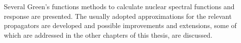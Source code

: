 \begin{WTabstract}%
Several Green's functions methods to calculate nuclear spectral 
functions and response are presented. The usually adopted approximations for 
the relevant propagators are developed 
and possible improvements and extensions, 
some of which are addressed in the other chapters of this thesis, are 
discussed. 
\end{WTabstract}
